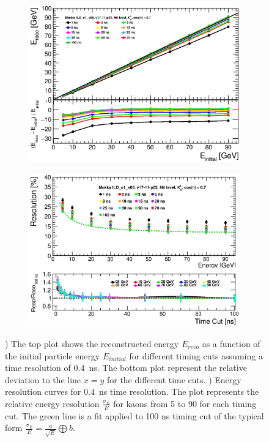 \begin{figure}[htbp!]
  \centering
  \begin{subfigure}[t]{0.49\textwidth}
    \centering
    \includegraphics[width=1\linewidth]{../Thesis_Plots/ILD/Smearing_0.4ns/Plots/Linearity_TimeCuts_Smearing1.eps}
    \caption{} \label{fig:Lin0.4ns}
  \end{subfigure}
  \hfill
  \begin{subfigure}[t]{0.49\textwidth}
    \centering
    \includegraphics[width=1\linewidth]{../Thesis_Plots/ILD/Smearing_0.4ns/Plots/ShowerResoAbsolute_TimeCuts_Smearing1.eps}
    \caption{} \label{fig:Reso0.4ns}
  \end{subfigure}
  \caption{) The top plot shows the reconstructed energy $E_{reco}$ as a function of the initial particle energy $E_{initial}$ for different timing cuts assuming a time resolution of \SI{0.4}{\nano\second}. The bottom plot represent the relative deviation to the line $x=y$ for the different time cuts. ) Energy resolution curves for \SI{0.4}{\nano\second} time resolution. The plot represents the relative energy resolution $\frac{\sigma_{E}}{E}$ for kaons from 5 to 90 \GeV for each timing cut. The green line is a fit applied to 100 ns timing cut of the typical form $\frac{\sigma_{E}}{E} = \frac{a}{\sqrt{E}} \bigoplus b$.}
\end{figure}

